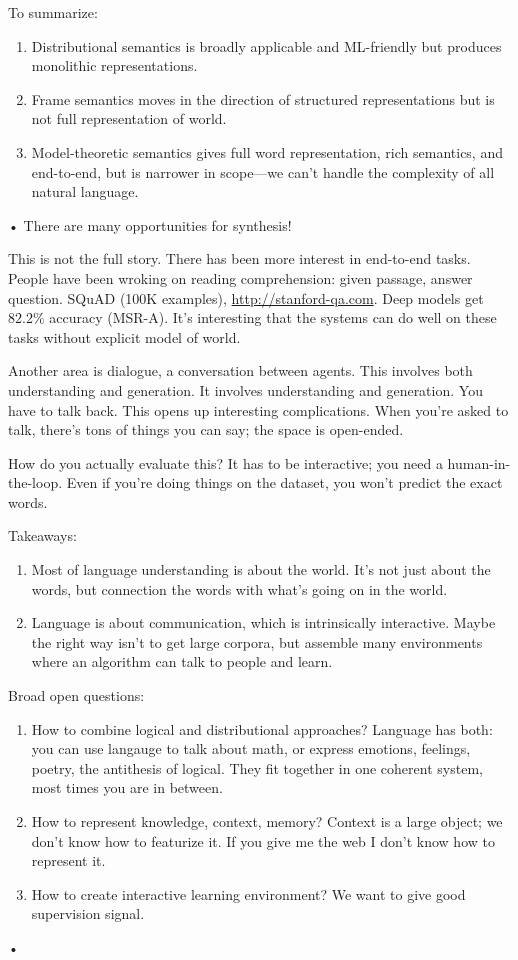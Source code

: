To summarize: 
\begin{enumerate}
\item
Distributional semantics is broadly applicable and ML-friendly but produces monolithic representations.
\item
Frame semantics moves in the direction of structured representations but is not full representation of world.
\item
Model-theoretic semantics gives full word representation, rich semantics, and end-to-end, but is narrower in scope---we can't handle the complexity of all natural language.
\end{enumerate}•
There are many opportunities for synthesis!

This is not the full story. There has been more interest in end-to-end tasks. People have been wroking on reading comprehension: given passage, answer question. SQuAD (100K examples), \url{http://stanford-qa.com}. Deep models get $82.2\%$ accuracy (MSR-A). It's interesting that the systems can do well on these tasks without explicit model of world.

Another area is dialogue, a conversation between agents. This involves both understanding and generation. It involves understanding and generation. You have to talk back. This opens up interesting complications. When you're asked to talk, there's tons of things you can say; the space is open-ended.

How do you actually evaluate this? It has to be interactive; you need a human-in-the-loop. Even if you're doing things on the dataset, you won't predict the exact words. 

Takeaways:
\begin{enumerate}
\item
Most of language understanding is about the world. It's not just about the words, but connection the words with what's going on in the world.
\item
Language is about communication, which is intrinsically interactive. Maybe the right way isn't to get large corpora, but assemble many environments where an algorithm can talk to people and learn.
\end{enumerate}

Broad open questions:
\begin{enumerate}
\item
How to combine logical and distributional approaches? Language has both: you can use langauge to talk about math, or express emotions, feelings, poetry, the antithesis of logical. They fit together in one coherent system, most times you are in between.
\item
How to represent knowledge, context, memory?
Context is a large object; we don't know how to featurize it. If you give me the web I don't know how to represent it.
\item
How to create interactive learning environment? We want to give good supervision signal. %
\end{enumerate}•

